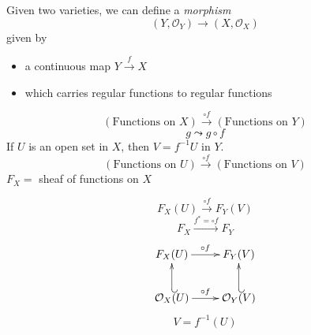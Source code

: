 \documentclass [letterpaper,11pt,twoside]{article}
\begin{document}
    \begin{defn*}
      Given two varieties, we can define a \emph{morphism}
      $$(Y, \mathcal O_Y) \to (X, \mathcal O_X)$$
      given by
      \begin{itemize}
        \item a continuous map $Y \xrightarrow{f} X$
        \item which carries regular functions to regular functions
      \end{itemize}
    \end{defn*}
    $$(\text{Functions on }X) \xrightarrow{\circ f} (\text{Functions on }Y)$$
    $$g \leadsto g \circ f$$
    If $U$ is an open set in $X$, then $V = f^{-1}U$ in $Y$.
    $$(\text{Functions on }U) \xrightarrow{\circ f}(\text{Functions on }V)$$
    $F_X = $ sheaf of functions on $X$

    $$F_X(U) \xrightarrow{\circ f} F_Y(V)$$
    $$F_X \xrightarrow{f^* = \circ f} F_Y$$
    $$\xymatrix{
      F_X(U) \ar[r]^{\circ f} & F_Y(V) \\
      \mathcal O_X(U) \ar@{_{(}->}[u] \ar[r]^{\circ f} &  \mathcal O_Y(V)
      \ar@{_{(}->}[u]
    }$$
    $$V = f^{-1}(U)$$
\end{document}
